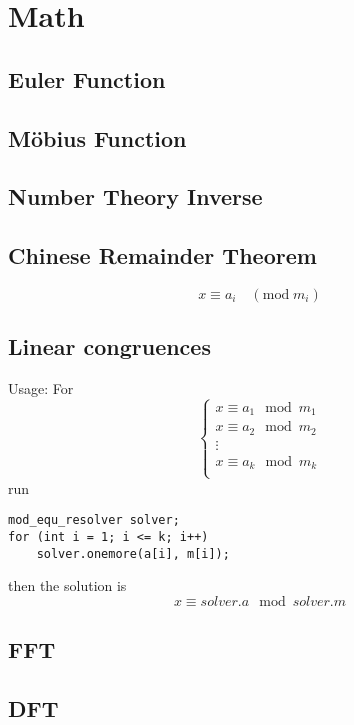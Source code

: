 \section{Math}

\subsection{Euler Function}


\subsection{Möbius Function}


\subsection{Number Theory Inverse}


\subsection{Chinese Remainder Theorem}
\[
	x \equiv a_i \quad (\mathrm{mod}\;m_i)
\]


\subsection{Linear congruences}

Usage:
For
\[
\left\{
    \begin{array}{l}
    x \equiv a_1 \mod m_1 \\
    x \equiv a_2 \mod m_2 \\
    \vdots \\
    x \equiv a_k \mod m_k \\
    \end{array}
\right.
\]
run
\begin{lstlisting}
mod_equ_resolver solver;
for (int i = 1; i <= k; i++)
    solver.onemore(a[i], m[i]);
\end{lstlisting}
then the solution is
\[
    x \equiv solver.a \mod solver.m
\]

\subsection{FFT}


\subsection{DFT}

